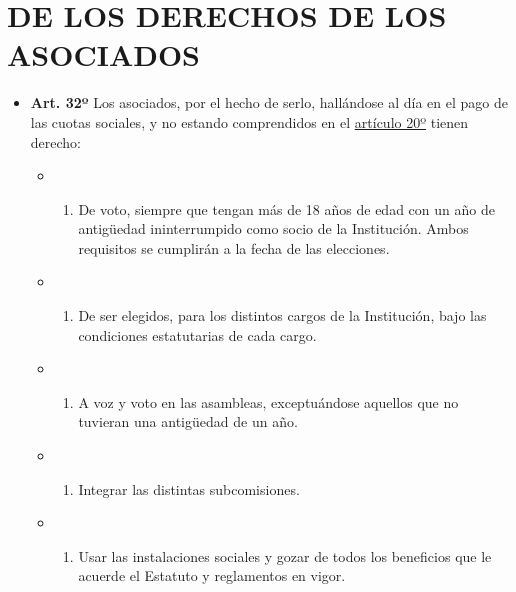 \documentclass[openany]{book}
\providecommand{\tightlist}{%
  \setlength{\itemsep}{0pt}\setlength{\parskip}{0pt}}
\begin{document}
\hypertarget{cap4}{%
\chapter{DE LOS DERECHOS DE LOS ASOCIADOS}\label{cap4}}

\begin{itemize}
\tightlist
\item
  \textbf{Art. 32º}
  Los asociados, por el hecho de serlo, hallándose al día en el pago de las cuotas sociales, y no estando comprendidos en el \protect\hyperlink{art20}{artículo 20º} tienen derecho:

  \begin{itemize}
  \item
    \begin{enumerate}
    \def\labelenumi{\alph{enumi})}
    \tightlist
    \item
      De voto, siempre que tengan más de 18 años de edad con un año de antigüedad ininterrumpido como socio de la Institución. Ambos requisitos se cumplirán a la fecha de las elecciones.
    \end{enumerate}
  \item
    \begin{enumerate}
    \def\labelenumi{\alph{enumi})}
    \setcounter{enumi}{1}
    \tightlist
    \item
      De ser elegidos, para los distintos cargos de la Institución, bajo las condiciones estatutarias de cada cargo.
    \end{enumerate}
  \item
    \begin{enumerate}
    \def\labelenumi{\alph{enumi})}
    \setcounter{enumi}{2}
    \tightlist
    \item
      A voz y voto en las asambleas, exceptuándose aquellos que no tuvieran una antigüedad de un año.
    \end{enumerate}
  \item
    \begin{enumerate}
    \def\labelenumi{\alph{enumi})}
    \setcounter{enumi}{3}
    \tightlist
    \item
      Integrar las distintas subcomisiones.
    \end{enumerate}
  \item
    \begin{enumerate}
    \def\labelenumi{\alph{enumi})}
    \setcounter{enumi}{4}
    \tightlist
    \item
      Usar las instalaciones sociales y gozar de todos los beneficios que le acuerde el Estatuto y reglamentos en vigor.

\end{enumerate}
\end{itemize}
\end{itemize}
\end{document}
